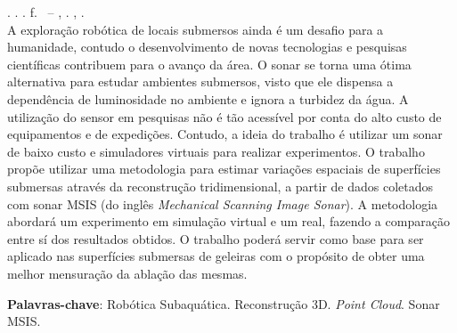 
\begin{resumo}[RESUMO]
\begin{SingleSpacing}

\imprimirautorcitacao. \imprimirtitulo. \imprimirdata. \pageref {LastPage} f. \imprimirprojeto\ – \imprimirprograma, \imprimirinstituicao. \imprimirlocal, \imprimirdata.\\

A exploração robótica de locais submersos ainda é um desafio para a humanidade, contudo o desenvolvimento de novas tecnologias e pesquisas científicas contribuem para o avanço da área.  
O sonar se torna uma ótima alternativa para estudar ambientes submersos, visto que ele dispensa a dependência de luminosidade no ambiente e ignora a turbidez da água. 
A utilização do sensor em pesquisas não é tão acessível por conta do alto custo de equipamentos e de expedições.
Contudo, a ideia do trabalho é utilizar um sonar de baixo custo e simuladores virtuais para realizar experimentos.
O trabalho propõe utilizar uma metodologia para estimar variações espaciais de superfícies submersas através da  reconstrução tridimensional, a partir de dados coletados com sonar MSIS (do inglês \textit{Mechanical Scanning Image Sonar}). 
A metodologia abordará um experimento em simulação virtual e um real, fazendo a comparação entre sí dos resultados obtidos.
O trabalho poderá servir como base para ser aplicado nas superfícies submersas de geleiras com o propósito de obter uma melhor mensuração da ablação das mesmas.


\vspace{2em}
\textbf{Palavras-chave}: Robótica Subaquática. Reconstrução 3D. \textit{Point Cloud}. Sonar MSIS.

\end{SingleSpacing}
\end{resumo}


